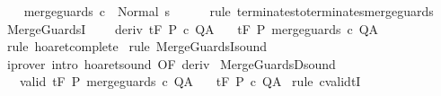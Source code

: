 \begin{isabellebody}
\isanewline
\ \ \isamarkupfalse%
\ {\isachardoublequoteopen}{\isasymGamma}{\isasymturnstile}merge{\isacharunderscore}guards\ c\ {\isasymdown}\ Normal\ s{\isachardoublequoteclose}\isanewline
\ \ \ \ \isamarkupfalse%
\ {\isacharparenleft}rule\ terminates{\isacharunderscore}to{\isacharunderscore}terminates{\isacharunderscore}merge{\isacharunderscore}guards{\isacharparenright}\isanewline
{}\isamarkupfalse%
%
\endisatagproof
{\isafoldproof}%
%
\isadelimproof
\isanewline
%
\endisadelimproof
\isanewline
{}\isamarkupfalse%
\ MergeGuardsI{\isacharcolon}\ \isanewline
\ \ \ deriv{\isacharcolon}\ {\isachardoublequoteopen}{\isasymGamma}{\isacharcomma}{\isasymTheta}{\isasymturnstile}\isactrlsub t\isactrlbsub {\isacharslash}F\isactrlesub \ P\ c\ Q{\isacharcomma}A{\isachardoublequoteclose}\isanewline
\ \ \ {\isachardoublequoteopen}{\isasymGamma}{\isacharcomma}{\isasymTheta}{\isasymturnstile}\isactrlsub t\isactrlbsub {\isacharslash}F\isactrlesub \ P\ merge{\isacharunderscore}guards\ c\ Q{\isacharcomma}A{\isachardoublequoteclose}\isanewline
%
\isadelimproof
%
\endisadelimproof
%
\isatagproof
{}\isamarkupfalse%
\ {\isacharparenleft}rule\ hoaret{\isacharunderscore}complete{\isacharprime}{\isacharparenright}\isanewline
{}\isamarkupfalse%
\ {\isacharparenleft}rule\ MergeGuardsI{\isacharunderscore}sound{\isacharparenright}\isanewline
{}\isamarkupfalse%
\ {\isacharparenleft}iprover\ intro{\isacharcolon}\ hoaret{\isacharunderscore}sound\ {\isacharbrackleft}OF\ deriv{\isacharbrackright}{\isacharparenright}\isanewline
{}\isamarkupfalse%
%
\endisatagproof
{\isafoldproof}%
%
\isadelimproof
\isanewline
%
\endisadelimproof
\isanewline
{}\isamarkupfalse%
\ MergeGuardsD{\isacharunderscore}sound{\isacharcolon}\ \isanewline
\ \ \ valid{\isacharcolon}\ {\isachardoublequoteopen}{\isasymGamma}{\isacharcomma}{\isasymTheta}{\isasymTurnstile}\isactrlsub t\isactrlbsub {\isacharslash}F\isactrlesub \ P\ merge{\isacharunderscore}guards\ c\ Q{\isacharcomma}A{\isachardoublequoteclose}\isanewline
\ \ \ {\isachardoublequoteopen}{\isasymGamma}{\isacharcomma}{\isasymTheta}{\isasymTurnstile}\isactrlsub t\isactrlbsub {\isacharslash}F\isactrlesub \ P\ c\ Q{\isacharcomma}A{\isachardoublequoteclose}\isanewline
%
\isadelimproof
%
\endisadelimproof
%
\isatagproof
{}\isamarkupfalse%
\ {\isacharparenleft}rule\ cvalidtI{\isacharparenright}\isanewline
\ \ \isamarkupfalse%

\end{isabellebody}

